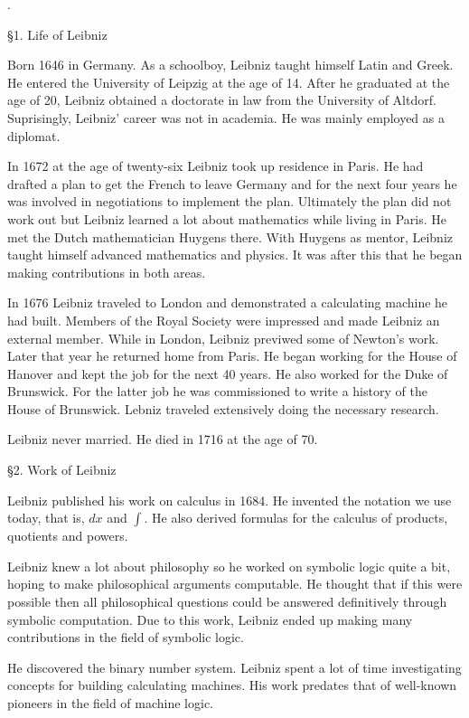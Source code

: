.


\item{\S1.} Life of Leibniz

Born 1646 in Germany.
As a schoolboy, Leibniz taught himself Latin and Greek.
He entered the University of Leipzig at the age of 14.
After he graduated at the age of 20, Leibniz obtained
a doctorate in law from the University of Altdorf.
Suprisingly, Leibniz' career was not in academia.
He was mainly employed as a diplomat.

In 1672 at the age of twenty-six Leibniz took up residence in Paris.
He had drafted a plan to get the French to leave Germany and
for the next four years he was involved in negotiations
to implement the plan.
Ultimately the plan did not work out but Leibniz learned
a lot about mathematics while living in Paris.
He met the Dutch mathematician Huygens there.
With Huygens as mentor, Leibniz taught himself
advanced mathematics and physics.
It was after this that he began making contributions
in both areas.

In 1676 Leibniz traveled to London and
demonstrated a calculating machine
he had built. Members of the Royal Society were
impressed and made Leibniz an external member.
While in London, Leibniz previwed some
of Newton's work.
Later that year he returned home from Paris.
He began working for the House of Hanover and kept the
job for the next 40 years.
He also worked for the Duke of Brunswick.
For the latter job he was commissioned to write a
history of the House of Brunswick.
Lebniz traveled extensively doing the necessary research.

Leibniz never married. He died in 1716 at the age of 70.

\item{\S2.} Work of Leibniz

Leibniz published his work on calculus in 1684.
He invented the notation we use today, that is,
$dx$ and $\int$.
He also derived formulas for the calculus
of products, quotients and powers.

Leibniz knew a lot about philosophy so he
worked on symbolic logic quite a bit,
hoping to make philosophical arguments
computable.
He thought that if this were possible then
all philosophical questions could be
answered definitively through symbolic
computation.
Due to this work, Leibniz ended up making many contributions
in the field of symbolic logic.

He discovered the binary number system.
Leibniz spent a lot of time investigating concepts
for building calculating machines.
His work predates that of well-known pioneers in the field
of machine logic.

